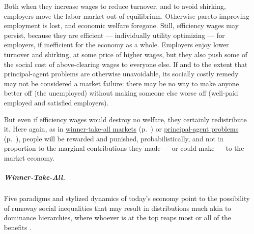Both when they increase wages to reduce turnover, and to avoid shirking, employers move the labor market out of equilibrium. Otherwise pareto-improving employment is lost, and economic welfare foregone. Still, efficiency wages may persist, because they are efficient --- individually utility optimizing --- for employers, if inefficient for the economy as a whole. Employers enjoy lower turnover and shirking, at some price of higher wages, but they also push some of the social cost of above-clearing wages to everyone else. If and to the extent that principal-agent problems are otherwise unavoidable, its socially costly remedy may not be considered a market failure: there may be no way to make anyone better off (the unemployed) without making someone else worse off (well-paid employed and satisfied employers).

But even if efficiency wages would destroy no welfare, they certainly redistribute it. Here again, as in \hyperref[sec:winner-take-all]{winner-take-all markets} (p.~\pageref{sec:winner-take-all}) or \hyperref[sec:principal-agent-problem]{principal-agent problems} (p.~\pageref{sec:principal-agent-problem}), people will be rewarded and punished, probabilistically, and not in proportion to the marginal contributions they made --- or could make --- to the market economy.

\subparagraph[Winner-Take-All]{Winner-Take-All.}  \label{sec:winner-take-all} Five paradigms and stylized dynamics of today's economy point to the possibility of runaway social inequalities that may result in distributions much akin to dominance hierarchies, where whoever is at the top reaps most or all of the benefits \citep{Frank1996}.


